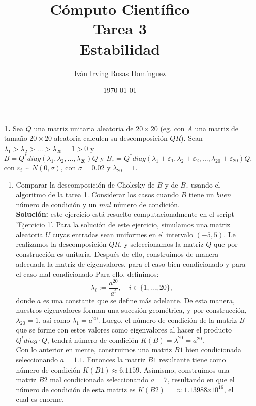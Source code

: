 \documentclass[letterpaper]{article}
\title{\textbf{Cómputo Científico\\
Tarea 3\\   
Estabilidad}}
\author{Iván Irving Rosas Domínguez}
\date{\today}
\newcommand{\1}{\mathds{1}}
\theoremstyle{definition}
\theoremstyle{definition}
\theoremstyle{definition}
\theoremstyle{definition}
\theoremstyle{definition}
\begin{document}
\maketitle


\begin{enumerate}
    \item [\textbf{1.}] Sea $Q$ una matriz unitaria aleatoria de $20\times20$ (eg. con $A$ una matriz
    de tamaño $20\times 20$ aleatoria calculen su descomposición $QR$). Sean $\lambda_1>\lambda_2>...>\lambda_{20}=1>0$
    y 
    \[
    B=Q^*diag(\lambda_1,\lambda_2,...,\lambda_{20})Q \text{ y } B_\varepsilon=Q^*diag(\lambda_1+\varepsilon_1,\lambda_2+\varepsilon_2,...,\lambda_{20}+\varepsilon_{20})Q,
    \]
    con $\varepsilon_i\sim N(0,\sigma)$, con  $\sigma=0.02$ y $\lambda_{20}=1$.
    \begin{enumerate}
        \item Comparar la descomposición de Cholesky de $B$ y de $B_\varepsilon$ usando 
        el algoritmo de la tarea 1. Considerar los casos cuando $B$ tiene un 
        $buen$ número de condición y un $mal$ número de condición.\\

        \textbf{Solución:} este ejercicio está resuelto computacionalmente en el script 'Ejercicio 1'. Para la solución de este ejercicio, simulamos una matriz aleatoria $U$ cuyas entradas sean uniformes
        en el intervalo $(-5,5)$. Le realizamos la descomposición $QR$, y seleccionamos la matriz $Q$ que por construcción es unitaria.
        Después de ello, construimos de manera adecuada la matriz de eigenvalores, para el caso bien condicionado y para el caso mal condicionado
        Para ello, definimos:
        \[
          \lambda_i:=\frac{a^{20}}{a^{i}}, \quad i\in \{1,...,20\},  
        \]
        donde $a$ es una constante que se define más adelante. De esta manera, nuestros eigenvalores forman una sucesión geométrica, y
        por construcción, $\lambda_20=1$, así como $\lambda_1=a^{20}$. Luego, el número de condición de la matriz $B$ que se forme con 
        estos valores como eigenvalores al hacer el producto $Q^t\dot diag\cdot Q$, tendrá número de condición $K(B)=\lambda^{20}=a^{20}$.\\

        Con lo anterior en mente, construimos una matriz $B1$ bien condicionada seleccionando $a=1.1$. Entonces la matriz $B1$ resultante tiene
        como número de condición $K(B1)\approx6.1159$. Asimismo, construimos una matriz $B2$ mal condicionada seleccionando $a=7$, resultando
        en que el número de condición de esta matriz es $K(B2)=\approx1.13988x10^{16}$, el cual es enorme.\\


\end{enumerate}
\end{enumerate}
\end{document}
